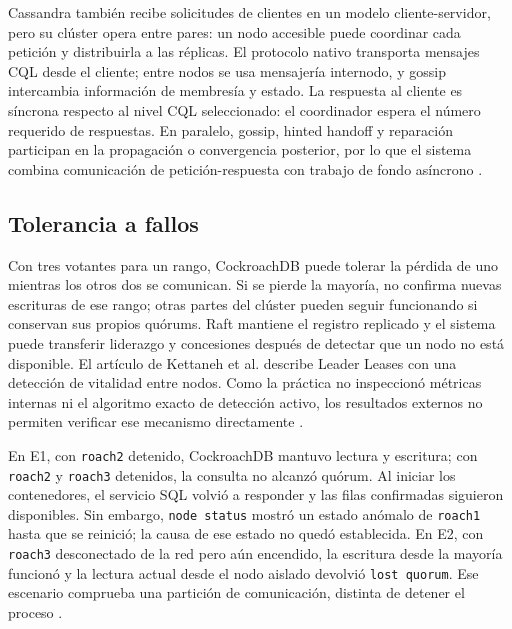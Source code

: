 \documentclass[11pt,a4paper]{article}
\begin{document}
Cassandra también recibe solicitudes de clientes en un modelo cliente-servidor, pero su clúster opera entre pares: un nodo accesible puede coordinar cada petición y distribuirla a las réplicas. El protocolo nativo transporta mensajes CQL desde el cliente; entre nodos se usa mensajería internodo, y gossip intercambia información de membresía y estado. La respuesta al cliente es síncrona respecto al nivel CQL seleccionado: el coordinador espera el número requerido de respuestas. En paralelo, gossip, hinted handoff y reparación participan en la propagación o convergencia posterior, por lo que el sistema combina comunicación de petición-respuesta con trabajo de fondo asíncrono \cite{apacheCassandraArchitecture,apacheCassandraNative,apacheCassandraMessaging,apacheCassandraDynamo,apacheCassandraRepair}.

\subsection{Tolerancia a fallos}

Con tres votantes para un rango, CockroachDB puede tolerar la pérdida de uno mientras los otros dos se comunican. Si se pierde la mayoría, no confirma nuevas escrituras de ese rango; otras partes del clúster pueden seguir funcionando si conservan sus propios quórums. Raft mantiene el registro replicado y el sistema puede transferir liderazgo y concesiones después de detectar que un nodo no está disponible. El artículo de Kettaneh et al. describe Leader Leases con una detección de vitalidad entre nodos. Como la práctica no inspeccionó métricas internas ni el algoritmo exacto de detección activo, los resultados externos no permiten verificar ese mecanismo directamente \cite{cockroachlabsReplication,kettaneh2026leaderleases}.

En E1, con \texttt{roach2} detenido, CockroachDB mantuvo lectura y escritura; con \texttt{roach2} y \texttt{roach3} detenidos, la consulta no alcanzó quórum. Al iniciar los contenedores, el servicio SQL volvió a responder y las filas confirmadas siguieron disponibles. Sin embargo, \texttt{node status} mostró un estado anómalo de \texttt{roach1} hasta que se reinició; la causa de ese estado no quedó establecida. En E2, con \texttt{roach3} desconectado de la red pero aún encendido, la escritura desde la mayoría funcionó y la lectura actual desde el nodo aislado devolvió \texttt{lost quorum}. Ese escenario comprueba una partición de comunicación, distinta de detener el proceso \cite{cockroachlabsReplication}.
\end{document}
